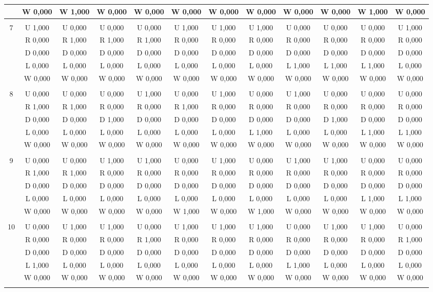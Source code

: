 \documentclass{article}
\begin{document}
\begin{table}[htbp]
\begin{footnotesize}
\begin{tabular}{c|c|c|c|c|c|c|c|c|c|c|c|}
&W 0,000&W 1,000&W 0,000&W 0,000&W 0,000&W 0,000&W 0,000&W 0,000&W 0,000&W 1,000&W 0,000\\
\hline \\
7&U 1,000&U 0,000&U 0,000&U 0,000&U 1,000&U 1,000&U 1,000&U 0,000&U 0,000&U 0,000&U 1,000\\
&R 0,000&R 1,000&R 1,000&R 1,000&R 0,000&R 0,000&R 0,000&R 0,000&R 0,000&R 0,000&R 0,000\\
&D 0,000&D 0,000&D 0,000&D 0,000&D 0,000&D 0,000&D 0,000&D 0,000&D 0,000&D 0,000&D 0,000\\
&L 0,000&L 0,000&L 0,000&L 0,000&L 0,000&L 0,000&L 0,000&L 1,000&L 1,000&L 1,000&L 0,000\\
&W 0,000&W 0,000&W 0,000&W 0,000&W 0,000&W 0,000&W 0,000&W 0,000&W 0,000&W 0,000&W 0,000\\
\hline \\
8&U 0,000&U 0,000&U 0,000&U 1,000&U 0,000&U 1,000&U 0,000&U 1,000&U 0,000&U 0,000&U 0,000\\
&R 1,000&R 1,000&R 0,000&R 0,000&R 1,000&R 0,000&R 0,000&R 0,000&R 0,000&R 0,000&R 0,000\\
&D 0,000&D 0,000&D 1,000&D 0,000&D 0,000&D 0,000&D 0,000&D 0,000&D 1,000&D 0,000&D 0,000\\
&L 0,000&L 0,000&L 0,000&L 0,000&L 0,000&L 0,000&L 1,000&L 0,000&L 0,000&L 1,000&L 1,000\\
&W 0,000&W 0,000&W 0,000&W 0,000&W 0,000&W 0,000&W 0,000&W 0,000&W 0,000&W 0,000&W 0,000\\
\hline \\
9&U 0,000&U 0,000&U 1,000&U 1,000&U 0,000&U 1,000&U 0,000&U 1,000&U 1,000&U 0,000&U 0,000\\
&R 1,000&R 1,000&R 0,000&R 0,000&R 0,000&R 0,000&R 0,000&R 0,000&R 0,000&R 0,000&R 0,000\\
&D 0,000&D 0,000&D 0,000&D 0,000&D 0,000&D 0,000&D 0,000&D 0,000&D 0,000&D 0,000&D 0,000\\
&L 0,000&L 0,000&L 0,000&L 0,000&L 0,000&L 0,000&L 0,000&L 0,000&L 0,000&L 1,000&L 1,000\\
&W 0,000&W 0,000&W 0,000&W 0,000&W 1,000&W 0,000&W 1,000&W 0,000&W 0,000&W 0,000&W 0,000\\
\hline \\
10&U 0,000&U 1,000&U 1,000&U 0,000&U 1,000&U 1,000&U 1,000&U 0,000&U 1,000&U 1,000&U 0,000\\
&R 0,000&R 0,000&R 0,000&R 1,000&R 0,000&R 0,000&R 0,000&R 0,000&R 0,000&R 0,000&R 1,000\\
&D 0,000&D 0,000&D 0,000&D 0,000&D 0,000&D 0,000&D 0,000&D 0,000&D 0,000&D 0,000&D 0,000\\
&L 1,000&L 0,000&L 0,000&L 0,000&L 0,000&L 0,000&L 0,000&L 1,000&L 0,000&L 0,000&L 0,000\\
&W 0,000&W 0,000&W 0,000&W 0,000&W 0,000&W 0,000&W 0,000&W 0,000&W 0,000&W 0,000&W 0,000\\
\hline \\
\end{tabular}
\end{footnotesize}
\end{table}
\end{document}
